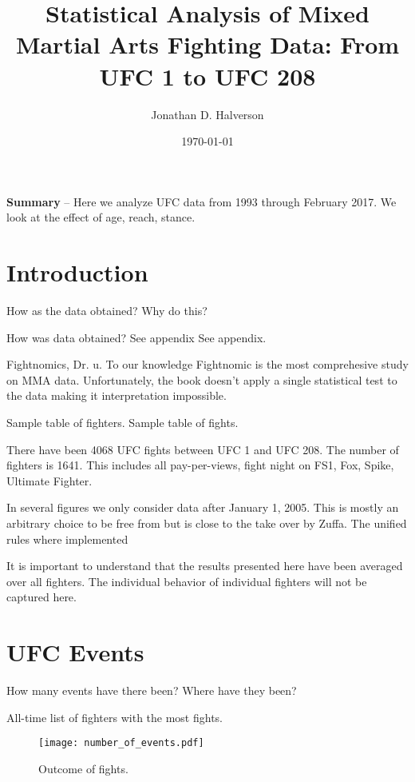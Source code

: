 \documentclass[12pt]{article}
\title{\Huge Statistical Analysis of Mixed Martial Arts Fighting Data: From UFC 1 to UFC 208}
\date{\Large \today}
\author{\Large Jonathan D. Halverson}
\begin{document}
\maketitle
\noindent
\textbf{Summary} -- Here we analyze UFC data from 1993 through February 2017. We look at the effect
of age, reach, stance.

\section*{Introduction}

How as the data obtained? Why do this?

How was data obtained? See appendix See appendix.

Fightnomics, Dr. u.
To our knowledge Fightnomic is the most comprehesive study on MMA
data. Unfortunately, the book doesn't apply a single statistical test
to the data making it interpretation impossible.

Sample table of fighters.
Sample table of fights.

There have been 4068 UFC fights between UFC 1 and UFC 208. The number of fighters is 1641.
This includes all pay-per-views, fight night on FS1, Fox, Spike, Ultimate Fighter.

In several figures we only consider data after January 1, 2005. This is mostly
an arbitrary choice to be free from but is close to the take over by Zuffa. The unified rules where implemented

It is important to understand that the results presented here have been
averaged over all fighters. The individual behavior of individual fighters
will not be captured here.

\section*{UFC Events}

How many events have there been? Where have they been?

\begin{center}
\begin{table}[h]

\caption{All-time list of fighters with the most fights.}
\end{table}
\end{center}


\begin{figure}[h]
\begin{center}
\texttt{[image: number\_of\_events.pdf]}
\caption{Outcome of fights.}
\end{center}
\end{figure}
\end{document}
